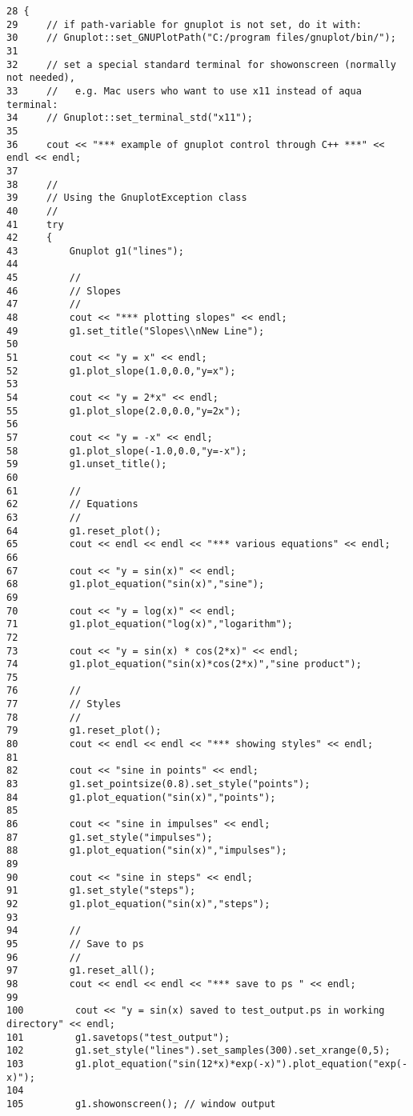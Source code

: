 \begin{Code}\begin{verbatim}28 {
29     // if path-variable for gnuplot is not set, do it with:
30     // Gnuplot::set_GNUPlotPath("C:/program files/gnuplot/bin/");
31 
32     // set a special standard terminal for showonscreen (normally not needed),
33     //   e.g. Mac users who want to use x11 instead of aqua terminal:
34     // Gnuplot::set_terminal_std("x11");
35 
36     cout << "*** example of gnuplot control through C++ ***" << endl << endl;
37 
38     //
39     // Using the GnuplotException class
40     //
41     try
42     {
43         Gnuplot g1("lines");
44 
45         //
46         // Slopes
47         //
48         cout << "*** plotting slopes" << endl;
49         g1.set_title("Slopes\\nNew Line");
50 
51         cout << "y = x" << endl;
52         g1.plot_slope(1.0,0.0,"y=x");
53 
54         cout << "y = 2*x" << endl;
55         g1.plot_slope(2.0,0.0,"y=2x");
56 
57         cout << "y = -x" << endl;
58         g1.plot_slope(-1.0,0.0,"y=-x");
59         g1.unset_title();
60 
61         //
62         // Equations
63         //
64         g1.reset_plot();
65         cout << endl << endl << "*** various equations" << endl;
66 
67         cout << "y = sin(x)" << endl;
68         g1.plot_equation("sin(x)","sine");
69 
70         cout << "y = log(x)" << endl;
71         g1.plot_equation("log(x)","logarithm");
72 
73         cout << "y = sin(x) * cos(2*x)" << endl;
74         g1.plot_equation("sin(x)*cos(2*x)","sine product");
75 
76         //
77         // Styles
78         //
79         g1.reset_plot();
80         cout << endl << endl << "*** showing styles" << endl;
81 
82         cout << "sine in points" << endl;
83         g1.set_pointsize(0.8).set_style("points");
84         g1.plot_equation("sin(x)","points");
85 
86         cout << "sine in impulses" << endl;
87         g1.set_style("impulses");
88         g1.plot_equation("sin(x)","impulses");
89 
90         cout << "sine in steps" << endl;
91         g1.set_style("steps");
92         g1.plot_equation("sin(x)","steps");
93 
94         //
95         // Save to ps
96         //
97         g1.reset_all();
98         cout << endl << endl << "*** save to ps " << endl;
99 
100         cout << "y = sin(x) saved to test_output.ps in working directory" << endl;
101         g1.savetops("test_output");
102         g1.set_style("lines").set_samples(300).set_xrange(0,5);
103         g1.plot_equation("sin(12*x)*exp(-x)").plot_equation("exp(-x)");
104 
105         g1.showonscreen(); // window output

\end{verbatim}
\end{Code}

